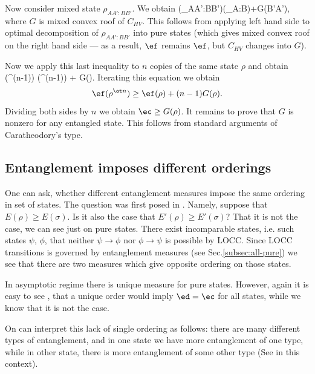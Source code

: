 \documentclass[twocolumn,aps,rmp]{revtex4}
\begin{document}
Now consider mixed state $\rho_{AA':BB'}$. We obtain \be
\ef(\rho_{AA':BB'})\geq \ef(\rho_{A:B})+G(B'\>A'), \ee where $G$ is
mixed convex roof of $C_{HV}$. This follows from applying left hand
side to optimal decomposition of $\rho_{AA':BB'}$ into pure states
(which gives mixed convex roof on the right hand side --- as a result,
$\ef$ remains $\ef$, but $C_{HV}$ changes into $G$).

Now we apply this last inequality to $n$ copies of the same state
$\rho$ and obtain \be \ef(\rho^{\ot (n-1)}\ot \rho) \geq
\ef(\rho^{\ot (n-1)}) + G(\rho). \ee Iterating this equation we
obtain \begin{equation} \ef(\rho^{\ot n}) \geq \ef(\rho) + (n-1) G(\rho). \end{equation}
Dividing both sides by $n$ we obtain $\ec \geq G(\rho)$. It remains
to prove that $G$ is nonzero for any entangled state. This follows
from standard arguments of Caratheodory's type.

\subsection{Entanglement imposes different orderings}
One can ask, whether different entanglement measures impose the same
ordering in set of states. The question was first posed in
\cite{VirmaniP1999-order}. Namely, suppose that $E(\rho)\geq
E(\sigma)$. Is it also the case that $E'(\rho)\geq E'(\sigma)$?
That it is not the case, we can see just on pure states. There
exist incomparable states, i.e. such states $\psi$, $\phi$, that
neither $\psi\to \phi$ nor $\phi\to\psi$ is possible by LOCC. Since
LOCC transitions is governed by entanglement measures (see
Sec.\ref{subsec:all-pure}) we see that there are two measures which
give opposite ordering on those states.

In asymptotic regime there is unique measure for pure states.
However, again it is easy to see \cite{VirmaniP1999-order}, that a unique order
would imply $\ed=\ec$ for all states, while we know that it is not the case.

On can interpret this lack of single ordering as follows:
there are many different types of entanglement,
and in one state we have more entanglement of one type, while in other state,
there is more entanglement of some other type
(See \cite{Miranowicz,Verstraete} in this context).
\end{document}
